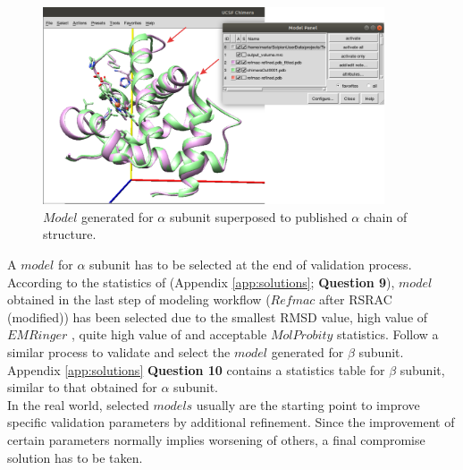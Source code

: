 \begin{itemize}
\begin{itemize}
   \begin{figure}[H]
    \centering 
    \captionsetup{width=.7\linewidth} 
    \includegraphics[width=0.90\textwidth]{Images/Fig38.png}
    \caption{$Model$ generated for  $\alpha$ subunit superposed to published $\alpha$ chain of  structure.}
    \label{fig:superpose_pdbs_chimera}
   \end{figure}
  
  
  \end{itemize}
 \end{itemize}
 
 A $model$ for  $\alpha$ subunit has to be selected at the end of validation process. According to the statistics of  (Appendix \ref{app:solutions}; \textbf{Question 9}), $model$ obtained in the last step of modeling workflow ($Refmac$ after RSRAC (modified)) has been selected due to the smallest RMSD value, high value of $EMRinger$ , quite high value of \ccmask and acceptable $MolProbity$ statistics. Follow a similar process to validate and select the $model$ generated for  $\beta$ subunit. Appendix \ref{app:solutions} \textbf{Question 10} contains a statistics table for  $\beta$ subunit, similar to that obtained for  $\alpha$ subunit.\\
 
 In the real world, selected $models$ usually are the starting point to improve specific validation parameters by additional refinement. Since the improvement of certain parameters normally implies worsening of others, a final compromise solution has to be taken.\\

